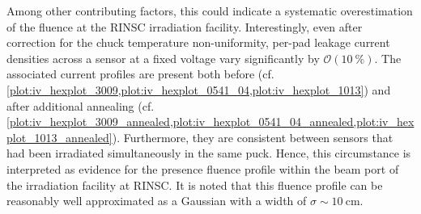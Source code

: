 Among other contributing factors, this could indicate a systematic overestimation of the fluence at the RINSC irradiation facility.\newline 
Interestingly, even after correction for the chuck temperature non-uniformity, per-pad leakage current densities across a sensor at a fixed voltage vary significantly by $\mathcal{O}(10~\%)$.
The associated current profiles are present both before (cf. \ref{plot:iv_hexplot_3009,plot:iv_hexplot_0541_04,plot:iv_hexplot_1013}) and after additional annealing (cf. \ref{plot:iv_hexplot_3009_annealed,plot:iv_hexplot_0541_04_annealed,plot:iv_hexplot_1013_annealed}).
Furthermore, they are consistent between sensors that had been irradiated simultaneously in the same puck.
Hence, this circumstance is interpreted as evidence for the presence fluence profile within the beam port of the irradiation facility at RINSC.
It is noted that this fluence profile can be reasonably well approximated as a Gaussian with a width of $\sigma\sim\SI{10}{\centi\metre}$.
